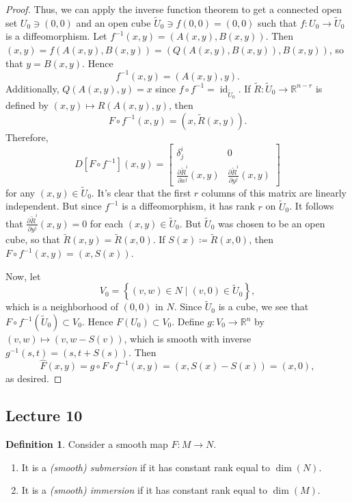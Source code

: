 \documentclass[10pt,letterpaper,cm]{nupset}
\theoremstyle{definition}
\newtheorem{definition}{Definition}[subsection]
\theoremstyle{theorem}
\theoremstyle{remark}
\newcommand{\R}{\mathbb R}
\newcommand{\1}{\mathbf{1}}
\newcommand{\0}{\vec 0}
\DeclareMathOperator{\id}{id}
\begin{document}
\begin{proof}
 Thus, we can apply the inverse function theorem to get a connected open set $U_0 \ni \left(0,0\right)$ and an open cube $\widetilde{U}_0 \ni f\left(0,0\right) = \left(0,0\right)$ such that $f: U_0 \to \widetilde{U}_0$ is a diffeomorphism.  Let $f^{-1}(x,y) =\left(A(x,y), B(x,y)\right)$. Then $\left(x,y\right) = f(A(x,y), B(x,y)) = \left(Q(A(x,y), B(x,y)), B(x,y)\right)$, so that $y = B(x,y)$. Hence $$f^{-1}(x,y) = \left(A(x,y), y\right).$$ Additionally, $Q(A(x,y), y)=x$ since $f\circ f^{-1} = \id_{\widetilde{U}_0}$. If $\widetilde{R} : \widetilde{U}_0 \to \R^{n-r}$ is defined by $\left(x,y\right) \mapsto R(A(x,y), y)$, then $$F\circ f^{-1}(x,y) = \left(x, \widetilde{R}(x,y)\right).$$ Therefore, $$D[F\circ f^{-1}](x,y)  =  \begin{bmatrix}    \delta^i_j & 0 \\ 
\frac{\partial{\widetilde{R}^i}}{\partial{x^j}}(x,y) & \frac{\partial{\widetilde{R}^i}}{\partial{y^j}}(x,y)    \end{bmatrix} $$ for any $\left(x,y\right) \in \widetilde{U}_0$. It's clear that the first $r$ columns of this matrix are linearly independent. But since $f^{-1}$ is a diffeomorphism, it has rank $r$ on $\widetilde{U}_0$. It follows that $ \frac{\partial{\widetilde{R}^i}}{\partial{y^j}}(x,y) =0$ for each $\left(x,y\right) \in \widetilde{U}_0$. But $\widetilde{U}_0$ was chosen to be an open cube, so that $\widetilde{R}(x,y) = \widetilde{R}(x,0)$. If $S(x) \coloneqq \widetilde{R}(x,0)$, then $F \circ f^{-1}(x,y) = \left(x, S(x)\right)$. 

\medskip

 Now, let $$V_0 = \left\{(v,w) \in N \mid (v,0)\in \widetilde{U}_0\right\},$$ which is a neighborhood of $\left(0,0\right)$ in  $N$. Since $\widetilde{U}_0$ is a cube, we see that $F \circ f^{-1}(\widetilde{U}_0) \subset V_0$. Hence $F(U_0) \subset V_0$.  Define $g : V_0 \to \R^n$ by $\left(v,w\right) \mapsto (v, w-S(v))$, which is smooth with inverse $g^{-1}(s,t) = \left(s, t + S(s)\right)$. Then $$\widehat{F}(x,y) = g \circ F \circ f^{-1}(x,y) = \left(x, S(x) - S(x)\right) = \left(x,0\right),$$ as desired.
\end{proof}

\subsection{Lecture 10}

\begin{definition} 
Consider a smooth map $F: M \to N$. 
\begin{enumerate}
\item It is a \textit{(smooth) submersion} if it has constant rank equal to $\dim(N)$. 
\item It is a \textit{(smooth) immersion} if it has constant rank equal to $\dim(M)$.
\end{enumerate}
\end{definition}
\end{document}
